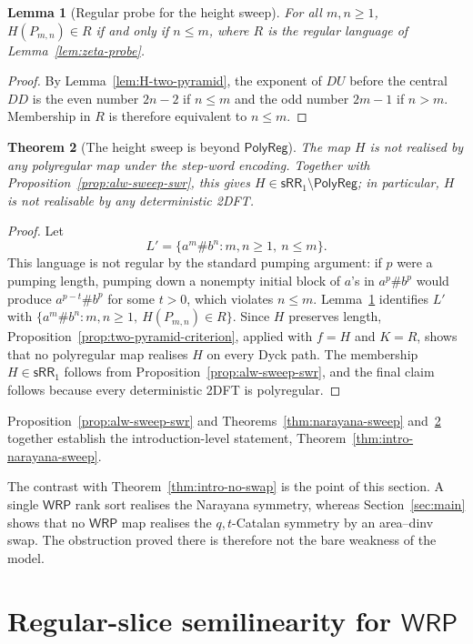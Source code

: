 \documentclass[11pt]{article}
\newtheorem{theorem}{Theorem}[section]
\newtheorem{lemma}[theorem]{Lemma}
\theoremstyle{definition}
\newcommand{\WRP}{\mathsf{WRP}}
\newcommand{\SWR}{\mathsf{sRR}_1}
\newcommand{\polyreg}{\mathsf{PolyReg}}
\begin{document}
\begin{lemma}[Regular probe for the height sweep]
\label{lem:H-probe}
For all $m,n\ge1$, $H(P_{m,n})\in R$ if and only if $n\le m$, where $R$ is
the regular language of Lemma~\ref{lem:zeta-probe}.
\end{lemma}

\begin{proof}
By Lemma~\ref{lem:H-two-pyramid}, the exponent of $DU$ before the central
$DD$ is the even number $2n-2$ if $n\le m$ and the odd number $2m-1$ if
$n>m$.  Membership in $R$ is therefore equivalent to $n\le m$.
\end{proof}

\begin{theorem}[The height sweep is beyond $\polyreg$]
\label{thm:H-not-polyregular}
The map $H$ is not realised by any polyregular map under the step-word
encoding.  Together with Proposition~\ref{prop:alw-sweep-swr}, this gives
$H\in\SWR\setminus\polyreg$; in particular, $H$ is not realisable by any
deterministic 2DFT.
\end{theorem}

\begin{proof}
Let
\[
   L'=\{a^m\#b^n:m,n\ge1,\ n\le m\}.
\]
This language is not regular by the standard pumping argument: if $p$ were a
pumping length, pumping down a nonempty initial block of $a$'s in $a^p\#b^p$
would produce $a^{p-t}\#b^p$ for some $t>0$, which violates $n\le m$.
Lemma~\ref{lem:H-probe} identifies $L'$ with
$\{a^m\#b^n:m,n\ge1,\ H(P_{m,n})\in R\}$.  Since $H$ preserves length,
Proposition~\ref{prop:two-pyramid-criterion}, applied with $f=H$ and $K=R$,
shows that no polyregular map realises $H$ on every Dyck path.  The membership
$H\in\SWR$ follows from Proposition~\ref{prop:alw-sweep-swr}, and the final
claim follows because every deterministic 2DFT is polyregular.
\end{proof}

Proposition~\ref{prop:alw-sweep-swr} and
Theorems~\ref{thm:narayana-sweep} and~\ref{thm:H-not-polyregular} together
establish the introduction-level statement,
Theorem~\ref{thm:intro-narayana-sweep}.

The contrast with Theorem~\ref{thm:intro-no-swap} is the point of this
section.  A single $\WRP$ rank sort realises the Narayana symmetry, whereas
Section~\ref{sec:main} shows that no $\WRP$ map realises the $q,t$-Catalan
symmetry by an area--dinv swap.  The obstruction proved there is therefore not
the bare weakness of the model.

\section[Regular-slice semilinearity for WRP]{Regular-slice semilinearity for $\WRP$}\label{sec:slice-semilinearity}
\end{document}
